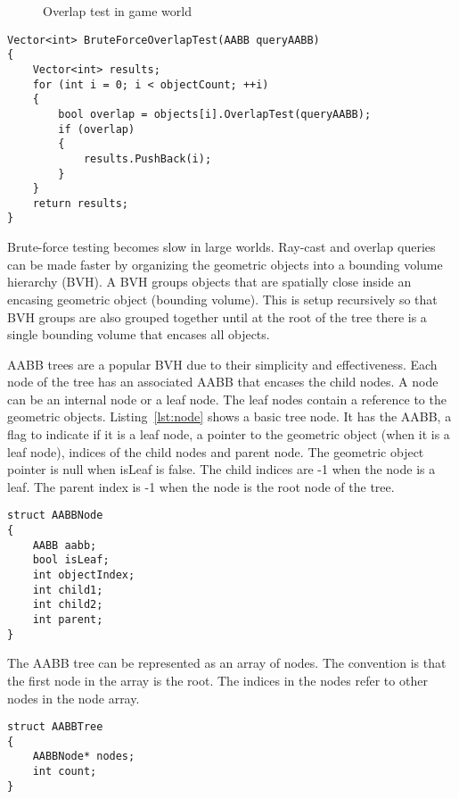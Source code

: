 \documentclass{article}
\begin{document}
\begin{figure}
	\begin{center}
		
	\end{center}
	\caption{Overlap test in game world}
	\label{fig:overlap}
\end{figure}

\begin{lstlisting}[caption={Brute-force overlap test}, label={lst:brute_overlap}, float]
Vector<int> BruteForceOverlapTest(AABB queryAABB)
{
	Vector<int> results;
	for (int i = 0; i < objectCount; ++i)
	{
		bool overlap = objects[i].OverlapTest(queryAABB);
		if (overlap)
		{
			results.PushBack(i);
		}
	}
	return results;
}
\end{lstlisting}

Brute-force testing becomes slow in large worlds. Ray-cast and overlap queries can be made faster by organizing the geometric objects into a bounding volume hierarchy (BVH). A BVH groups objects that are spatially close inside an encasing geometric object (bounding volume). This is setup recursively so that BVH groups are also grouped together until at the root of the tree there is a single bounding volume that encases all objects.

AABB trees are a popular BVH due to their simplicity and effectiveness. Each node of the tree has an associated AABB that encases the child nodes. A node can be an internal node or a leaf node. The leaf nodes contain a reference to the geometric objects. Listing~\ref{lst:node} shows a basic tree node. It has the AABB, a flag to indicate if it is a leaf node, a pointer to the geometric object (when it is a leaf node), indices of the child nodes and parent node. The geometric object pointer is null when isLeaf is false. The child indices are -1 when the node is a leaf. The parent index is -1 when the node is the root node of the tree.
\begin{lstlisting}[caption={AABB tree node}, label={lst:node}, float]
struct AABBNode
{
	AABB aabb;
	bool isLeaf;
	int objectIndex;
	int child1;
	int child2;
	int parent;
}
\end{lstlisting}

The AABB tree can be represented as an array of nodes. The convention is that the first node in the array is the root. The indices in the nodes refer to other nodes in the node array.

\begin{lstlisting}[caption={AABB tree}, label={lst:tree}, float]
struct AABBTree
{
	AABBNode* nodes;
	int count;
}
\end{lstlisting}
\end{document}
